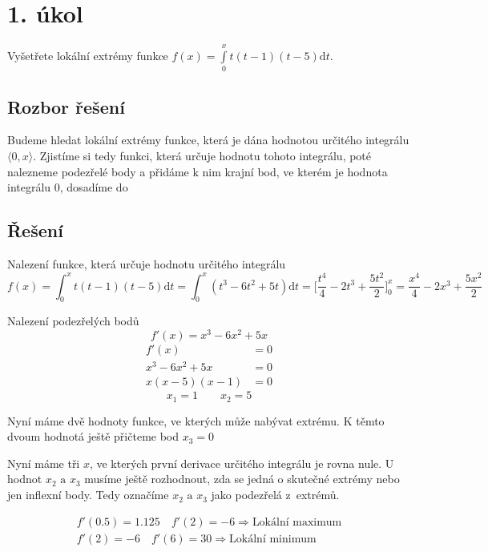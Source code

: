\section{1. úkol}
Vyšetřete lokální extrémy funkce $f(x) = \int\limits_0^x t(t-1)(t-5)\mathrm{d}t$.

\subsection*{Rozbor řešení}
Budeme hledat lokální extrémy funkce, která je dána hodnotou určitého integrálu  $\langle 0, x \rangle$. Zjistíme si tedy funkci, která určuje hodnotu tohoto integrálu, poté nalezneme podezřelé body a přidáme k nim krajní bod, ve kterém je hodnota integrálu 0, dosadíme do 

\subsection*{Řešení}

\noindent Nalezení funkce, která určuje hodnotu určitého integrálu
\begin{displaymath}
	f(x) = \int_0^x t(t-1)(t-5)\mathrm{d}t = \int_0^x (t^3 - 6t^2 + 5t)\mathrm{d}t = \Big[\frac{t^4}{4} - 2t^3 + \frac{5t^2}{2}\Big]_0^x = \frac{x^4}{4} - 2x^3 + \frac{5x^2}{2}
\end{displaymath}

\noindent Nalezení podezřelých bodů
\begin{displaymath}
	f'(x) = x^3 - 6x^2 + 5x
\end{displaymath}
\begin{eqnarray}
	f'(x) & = 0 \nonumber\\
    x^3 - 6x^2 + 5x & = 0 \nonumber \\
    x(x - 5)(x - 1) & = 0 \nonumber
\end{eqnarray}
\begin{displaymath}
	x_1 = 1\qquad x_2 = 5
\end{displaymath}

Nyní máme dvě hodnoty funkce, ve kterých může nabývat extrému. K těmto dvoum hodnotá ještě přičteme bod $x_3 = 0$

Nyní máme tři $x$, ve kterých první derivace určitého integrálu je rovna nule. U hodnot $x_2 \text{ a } x_3$ musíme ještě rozhodnout, zda se jedná o skutečné extrémy nebo jen inflexní body. Tedy označíme $x_2 \text{ a } x_3$ jako podezřelá z~extrémů.

\begin{eqnarray}
f'(0.5) = 1.125 \quad f'(2) = -6 \Rightarrow \mbox{Lokální maximum} \nonumber \\
f'(2) = -6 \quad f'(6) = 30 \Rightarrow \mbox{Lokální minimum} \nonumber
\end{eqnarray}

